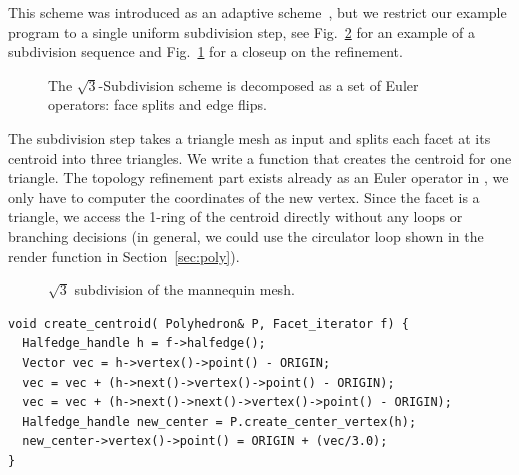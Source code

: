 \label{sec:sqrt3}

This scheme was introduced as an adaptive scheme~\cite{sqrt3}, but we
restrict our example program to a single uniform subdivision step, see
Fig.~\ref{fig:sqrt3} for an example of a subdivision sequence and
Fig.~\ref{fig:sqrt3_basic} for a closeup on the refinement.


\begin{figure}[htb]
    \caption{The $\sqrt{3}$-Subdivision scheme is decomposed as
             a set of Euler operators: face splits and edge flips.}
    \label{fig:sqrt3_basic}
\end{figure}

The subdivision step takes a triangle mesh as input and splits each
facet at its centroid into three triangles.  We write a function that
creates the centroid for one triangle. The topology refinement part
exists already as an Euler operator in \cgalpoly, we only have to
computer the coordinates of the new vertex. Since the facet is a
triangle, we access the 1-ring of the centroid directly without any
loops or branching decisions (in general, we could use the circulator
loop shown in the render function in Section~\ref{sec:poly}).


\begin{figure}[htb]
    \caption{$\sqrt{3}$ subdivision of the mannequin mesh.}
    \label{fig:sqrt3}
\end{figure}


\begin{lstlisting}
void create_centroid( Polyhedron& P, Facet_iterator f) {
  Halfedge_handle h = f->halfedge();
  Vector vec = h->vertex()->point() - ORIGIN;
  vec = vec + (h->next()->vertex()->point() - ORIGIN);
  vec = vec + (h->next()->next()->vertex()->point() - ORIGIN);
  Halfedge_handle new_center = P.create_center_vertex(h);
  new_center->vertex()->point() = ORIGIN + (vec/3.0);
}
\end{lstlisting}\vspace*{-3mm}

